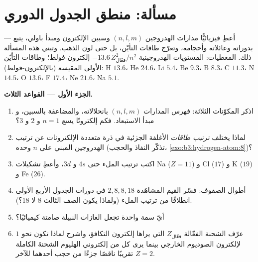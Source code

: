 \section{مسألة: منطق الجدول الدوري}

\begin{problem}\label{pb:b3:identical-particles:1}
أعطِ فيزيائيًّا مدارات الهدروجين $(n, l, m)$ وسبين الإلكترون
ومبدأ باولي، يتبع  ---
بدوراته وعائلاته وأحجامه، وتعرّج طاقات التأيّن، بل حتى
لون الذهب. وتبني هذه المسألة ذلك. المعطيات: المستويات
الهدروجينية $-13.6\,Z_{\text{فعّال}}^2/n^2$ إلكترون-فولط؛ وطاقات التأيّن
الأولى المقيسة (بالإلكترون-فولط): H $13.6$، He $24.6$، Li $5.4$، Be $9.3$، B $8.3$،
C $11.3$، N $14.5$، O $13.6$، F $17.4$، Ne $21.6$، Na $5.1$.

\medskip\noindent\textbf{الجزء الأول --- القواعد الثلاث.}
\begin{enumerate}
  \item اذكر المكوّنات الثلاثة: فهرس المدارات
        $(n, l, m)$ بانحلالاته، والمضاعفة بالسبين، و
        مبدأ الاستبعاد. فكم إلكترونًا يسع $n = 1$ و
        $2$ و $3$؟
  \item لماذا يختلف \emph{ترتيب طاقات} الأغلفة الجزئية في
        ذرة متعددة الإلكترونات عن ترتيب الهدروجين المبني على $n$ وحده
        (تذكّر النفاذ والحجب،
        \cref{exo:b3:hydrogen-atom:8})؟
  \item اكتب ترتيب الملء حتى $4s$ و $3d$، وأعطِ
        تشكيلات Na ($Z = 11$) و Cl ($17$) و K ($19$)
        و Fe ($26$).
  \item أطوال الصفوف: فسّر القيم المشاهَدة $2, 8, 8, 18$ في
        دورات الجدول الأربع الأولى انطلاقًا من ترتيب الملء (ولماذا
        يكون الصف الثالث 8 لا 18؟).
  \item أيّ سمة واحدة تجعل الغازات النبيلة صامتة كيميائيًا؟
  \item عرّف الشحنة الفعّالة $Z_{\text{فعّال}}$ التي يراها إلكترون
        التكافؤ، واشرح لماذا تكون نحو $1$ لإلكترون
        الصوديوم الخارجي بينما يرى كل من إلكتروني الهليوم
        الشحنةَ الكاملة $Z = 2$ تقريبًا ناقصًا جزءًا من حجب
        أحدهما للآخر.
\end{enumerate}


\end{problem}
